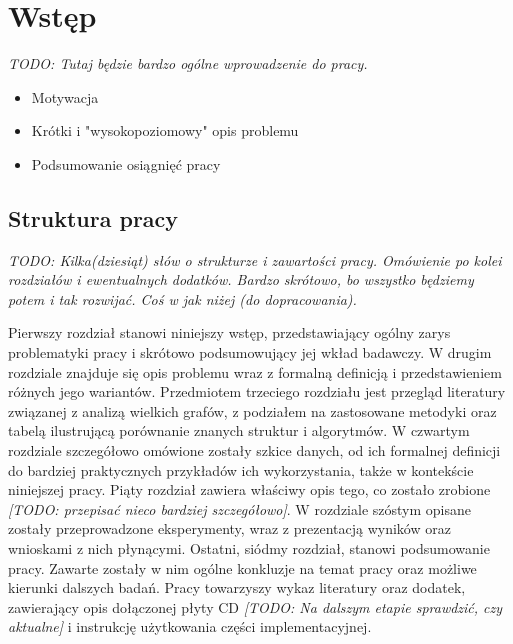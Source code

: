 \chapter{Wstęp}

\emph{TODO: Tutaj będzie bardzo ogólne wprowadzenie do pracy.}
\begin{itemize}
    \item Motywacja
    \item Krótki i "wysokopoziomowy" opis problemu
    \item Podsumowanie osiągnięć pracy
\end{itemize}

\section{Struktura pracy}
\emph{TODO: Kilka(dziesiąt) słów o strukturze i zawartości pracy. Omówienie po kolei rozdziałów i ewentualnych dodatków. Bardzo skrótowo, bo wszystko będziemy potem  i tak rozwijać. Coś w jak niżej (do dopracowania).}

Pierwszy rozdział stanowi niniejszy wstęp, przedstawiający ogólny zarys problematyki pracy i skrótowo podsumowujący jej wkład badawczy. W drugim rozdziale znajduje się opis problemu wraz z formalną definicją i przedstawieniem różnych jego wariantów. Przedmiotem trzeciego rozdziału jest przegląd literatury związanej z analizą wielkich grafów, z podziałem na zastosowane metodyki oraz tabelą ilustrującą porównanie znanych struktur i algorytmów.  W czwartym rozdziale szczegółowo omówione zostały szkice danych, od ich formalnej definicji do bardziej praktycznych przykładów ich wykorzystania, także w kontekście niniejszej pracy. Piąty rozdział zawiera właściwy opis tego, co zostało zrobione \emph{[TODO: przepisać nieco bardziej szczegółowo]}. W rozdziale szóstym opisane zostały przeprowadzone eksperymenty, wraz z prezentacją wyników oraz wnioskami z nich płynącymi. Ostatni, siódmy rozdział, stanowi podsumowanie pracy. Zawarte zostały w nim ogólne konkluzje na temat pracy oraz możliwe kierunki dalszych badań. Pracy towarzyszy wykaz literatury oraz dodatek, zawierający opis dołączonej płyty CD \emph{[TODO: Na dalszym etapie sprawdzić, czy aktualne]} i instrukcję użytkowania części implementacyjnej. 